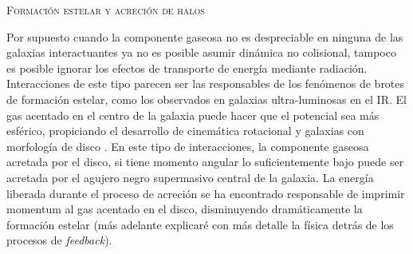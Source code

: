 \documentclass[xcolor=dvipsnames,4pt,hyperref={colorlinks,citecolor=black,linkcolor=black,urlcolor=black}]{beamer}
\begin{document}
\begin{frame}[allowframebreaks]{\textsc{Formación estelar y acreción de halos}}
\begin{description}
Por supuesto cuando la componente gaseosa no es despreciable en ninguna de las galaxias
interactuantes ya no es posible asumir dinámica no colisional, tampoco es posible ignorar los
efectos de transporte de energía mediante radiación. Interacciones de este tipo parecen ser las
responsables de los fenómenos de brotes de formación estelar, como los observados en galaxias
ultra-luminosas en el IR. El gas acentado en el centro de la galaxia puede hacer que el potencial
sea más esférico, propiciando el desarrollo de cinemática rotacional y galaxias con morfología de
disco \citep{Jesseit2007}. En este tipo de interacciones, la componente gaseosa acretada por el
disco, si tiene momento angular lo suficientemente bajo puede ser acretada por el agujero negro
supermasivo central de la galaxia. La energía liberada durante el proceso de acreción se ha
encontrado responsable de imprimir momentum al gas acentado en el disco, disminuyendo dramáticamente
la formación estelar (más adelante explicaré con más detalle la física detrás de los procesos de
\emph{feedback}).
\end{description}
%
\end{frame}
\end{document}
